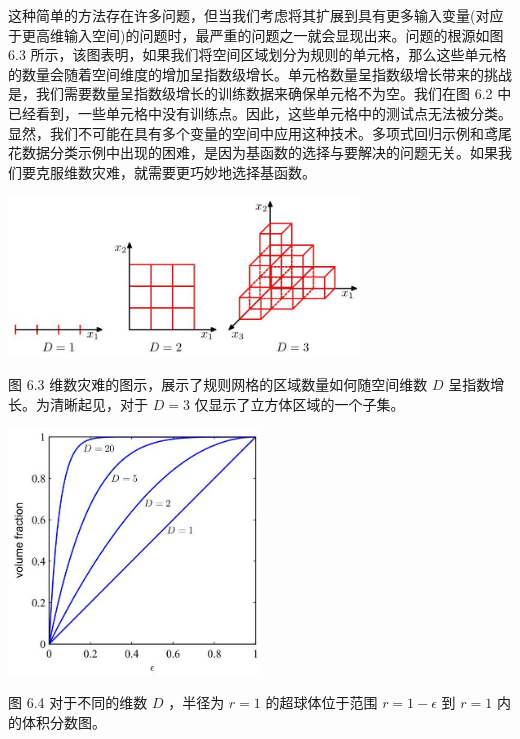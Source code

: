 \documentclass[10pt]{report}
\begin{document}
这种简单的方法存在许多问题，但当我们考虑将其扩展到具有更多输入变量(对应于更高维输入空间)的问题时，最严重的问题之一就会显现出来。问题的根源如图 6.3 所示，该图表明，如果我们将空间区域划分为规则的单元格，那么这些单元格的数量会随着空间维度的增加呈指数级增长。单元格数量呈指数级增长带来的挑战是，我们需要数量呈指数级增长的训练数据来确保单元格不为空。我们在图 6.2 中已经看到，一些单元格中没有训练点。因此，这些单元格中的测试点无法被分类。显然，我们不可能在具有多个变量的空间中应用这种技术。多项式回归示例和鸢尾花数据分类示例中出现的困难，是因为基函数的选择与要解决的问题无关。如果我们要克服维数灾难，就需要更巧妙地选择基函数。

\begin{center}
\includegraphics[max width=0.7\textwidth]{images/0194e279-9b28-703a-88f4-c3ac21e2010d_193_657_1598_878_399_0.jpg}
\end{center}
\hspace*{3em} 

图 6.3 维数灾难的图示，展示了规则网格的区域数量如何随空间维数 \(D\) 呈指数增长。为清晰起见，对于 \(D = 3\) 仅显示了立方体区域的一个子集。

\begin{center}
\includegraphics[max width=0.5\textwidth]{images/0194e279-9b28-703a-88f4-c3ac21e2010d_194_931_346_617_603_0.jpg}
\end{center}
\hspace*{3em} 

图 6.4 对于不同的维数 \(D\) ，半径为 \(r = 1\) 的超球体位于范围 \(r = 1 - \epsilon\) 到 \(r = 1\) 内的体积分数图。
\end{document}
